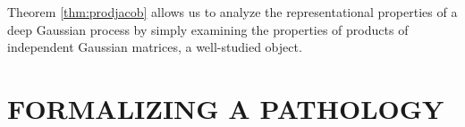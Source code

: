 \documentclass[twoside]{article}
\newcommand{\sectiondist}{}
\begin{document}
\vspace{-0.1in}
Theorem \ref{thm:prodjacob} allows us to analyze the representational properties of a deep Gaussian process by simply examining the properties of products of independent Gaussian matrices, a well-studied object.





\section{FORMALIZING A PATHOLOGY}
\sectiondist

\end{document}
